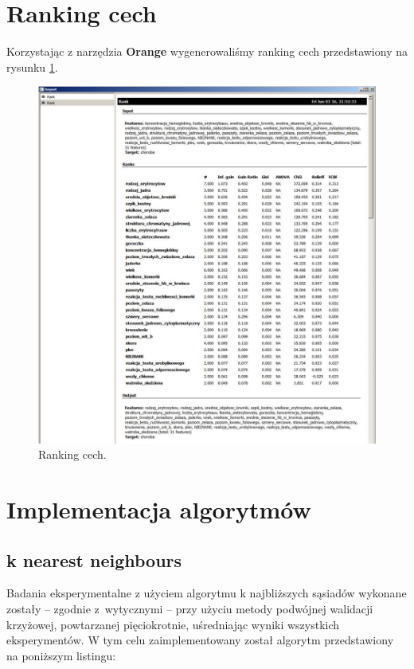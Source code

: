 \documentclass[11pt, a4paper, titlepage]{report}
\begin{document}
\section{Ranking cech}
\label{sec:Ranking cech}
Korzystając z narzędzia \textbf{Orange} wygenerowaliśmy ranking cech przedstawiony na rysunku \ref{fig:ranking}.
\newpage
\begin{figure}[h]
  \label{fig:ranking}
  \includegraphics[scale=0.5]{obrazki/ranking}
  \caption{Ranking cech.}
\end{figure}

\section{Implementacja algorytmów}
\label{sec:Implementacja algorytmów}
\subsection{k nearest neighbours}
\label{subs:k nearest neighbours}
Badania eksperymentalne z użyciem algorytmu k najbliższych sąsiadów wykonane zostały – zgodnie z wytycznymi – przy użyciu metody podwójnej walidacji krzyżowej, powtarzanej pięciokrotnie, uśredniając wyniki wszystkich eksperymentów. W tym celu zaimplementowany został algorytm przedstawiony na poniższym listingu:\\
\end{document}
